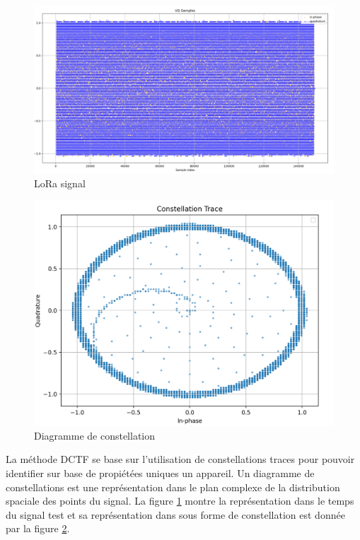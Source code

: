 \begin{figure}[h]
\centering

\includegraphics[scale=0.08]{images/dctf2.png}
\caption{LoRa signal}\label{term313}
\end{figure}

\begin{figure}[h]
\centering

\includegraphics[scale=0.18]{images/dctf1.png}
\caption{Diagramme de constellation}\label{term314}
\end{figure}


La méthode DCTF se base sur l'utilisation de constellations traces pour pouvoir identifier sur base de propiétées uniques un appareil. Un diagramme de constellations est une représentation dans le plan complexe de la distribution spaciale des points du signal. La figure \ref{term313} montre la représentation dans le temps du signal test et sa représentation dans sous forme de constellation est donnée par la figure \ref{term314}.

